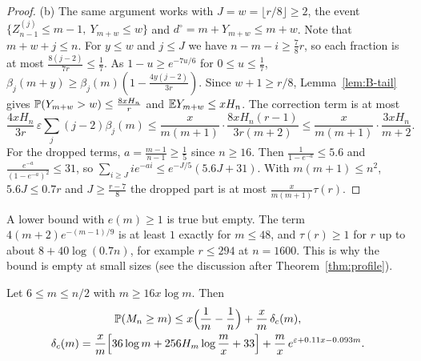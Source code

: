 \begin{proof}
(b) The same argument works with $J=w=\lfloor r/8\rfloor\ge2$, the event
$\{Z^{(j)}_{n-1}\le m-1,\ Y_{m+w}\le w\}$ and $d^\circ=m+Y_{m+w}\le m+w$.
Note that $m+w+j\le n$. For $y\le w$ and $j\le J$ we have
$n-m-i\ge\frac78r$, so each fraction is at most
$\frac{8(j-2)}{7r}\le\frac17$. As $1-u\ge e^{-7u/6}$ for $0\le u\le\frac17$,
$\beta_j(m+y)\ge\beta_j(m)(1-\frac{4y(j-2)}{3r})$. Since $w+1\ge r/8$,
Lemma~\ref{lem:B-tail} gives $\mathbb{P}(Y_{m+w}>w)\le\frac{8xH_n}r$ and
$\mathbb{E} Y_{m+w}\le xH_n$. The correction term is at most
\[
 \frac{4xH_n}{3r}\,\varepsilon\sum_j(j-2)\beta_j(m)
 \le\frac{x}{m(m+1)}\cdot\frac{8xH_n(r-1)}{3r(m+2)}\le\frac{x}{m(m+1)}\cdot\frac{3xH_n}{m+2}.
\]
For the dropped terms, $a=\frac{m-1}{n-1}\ge\frac15$ since $n\ge16$. Then
$\frac1{1-e^{-a}}\le5.6$ and $\frac{e^{-a}}{(1-e^{-a})^2}\le31$, so
$\sum_{i\ge J}ie^{-ai}\le e^{-J/5}(5.6J+31)$. With $m(m+1)\le n^2$,
$5.6J\le0.7r$ and $J\ge\frac{r-7}8$ the dropped part is at most
$\frac{x}{m(m+1)}\tau(r)$.
\end{proof}

A lower bound with $e(m)\ge1$ is true but empty. The term
$4(m+2)e^{-(m-1)/9}$ is at least $1$ exactly for $m\le48$, and $\tau(r)\ge1$
for $r$ up to about $8+40\log(0.7n)$, for example $r\le294$ at $n=1600$.
This is why the bound is empty at small sizes (see the discussion after
Theorem~\ref{thm:profile}).

\begin{theorem}\label{thm:B-cum-upper}
Let $6\le m\le n/2$ with $m\ge16x\log m$. Then
\begin{gather*}
 \mathbb{P}(M_n\ge m)\le x\Bigl(\frac1m-\frac1n\Bigr)+\frac xm\,\delta_c(m),\\
 \delta_c(m)=\frac xm\Bigl[36\log m+256H_m\log\frac mx+33\Bigr]+\frac mx\,e^{\varepsilon+0.11x-0.093m}.
\end{gather*}
\end{theorem}

